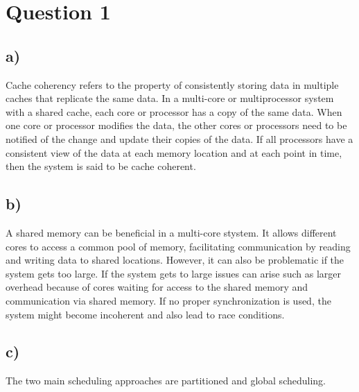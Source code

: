 \section*{Question 1} 
    \subsection*{a)}
    Cache coherency refers to the property of consistently storing data in multiple caches that replicate the same data. In a multi-core or multiprocessor system with a shared cache, each core or processor has a copy of the same data. When one core or processor modifies the data, the other cores or processors need to be notified of the change and update their copies of the data. If all processors have a consistent view of the data at each memory location and at each point in time, then the system is said to be cache coherent.

    \subsection*{b)}
    A shared memory can be beneficial in a multi-core stystem. It allows different cores to access a common pool of memory, facilitating communication by reading and writing data to shared locations. However, it can also be problematic if the system gets too large. If the system gets to large issues can arise such as larger overhead because of cores waiting for access to the shared memory and communication via shared memory. If no proper synchronization is used, the system might become incoherent and also lead to race conditions.

    \subsection*{c)}
    The two main scheduling approaches are partitioned and global scheduling. 
